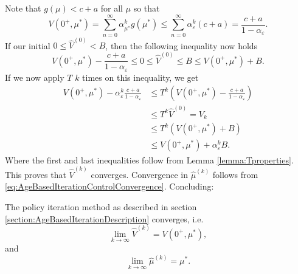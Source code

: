 Note that $g(\mu)<c+a$ for all $\mu$ so that 
$$
V(0^+,\mu^*)=\sum\limits_{n=0}^\infty \alpha_{\mu^*}^kg(\mu^*)\leq \sum\limits_{n=0}^\infty \alpha_\varepsilon^k(c+a)=\frac{c+a}{1-\alpha_\varepsilon}.
$$
If our initial $0\leq \hat{V}^{(0)}<B$, then the following inequality now holds
$$
V(0^+,\mu^*)-\frac{c+a}{1-\alpha_\varepsilon}\leq 0\leq \hat{V}^{(0)}\leq B\leq V(0^+,\mu^*)+B.
$$
If we now apply $T$ $k$ times on this inequality, we get
\[\begin{split}
V(0^+,\mu^*)-\alpha_\varepsilon^k\frac{c+a}{1-\alpha_\varepsilon} &\leq T^k(V(0^+,\mu^*)-\frac{c+a}{1-\alpha_\varepsilon})\\
&\leq  T^k\hat{V}^{(0)}=V_k\\
&\leq T^k(V(0^+,\mu^*)+B) \\
&\leq V(0^+,\mu^*)+\alpha_\varepsilon^kB.
\end{split}\]
Where the first and last inequalities follow from Lemma \ref{lemma:Tproperties}.
This proves that $\hat{V}^{(k)}$ converges.
Convergence in $\hat\mu^{(k)}$ follows from \eqref{eq:AgeBasedIterationControlConvergence}.
Concluding:
\begin{theorem}
	The policy iteration method as described in section \ref*{section:AgeBasedIterationDescription} converges, i.e.
	\[\lim\limits_{k\rightarrow\infty}\hat{V}^{(k)}=V(0^+,\mu^*),\]
	and
	\[\lim\limits_{k\rightarrow\infty}\hat{\mu}^{(k)}=\mu^*.\]
\end{theorem}